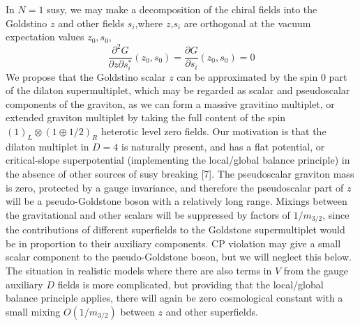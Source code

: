 \documentclass[a4paper,12pt]{article}
\begin{document}
In $N=1$ susy, we may make a decomposition of the chiral fields
into the Goldstino $z$ and other fields $s_{i}$,where $z$,$s_{i}$
are orthogonal at the vacuum expectation values $z_{0},s_{0}$,
\begin{equation}
\frac{\partial^2 G}{\partial z \partial s^{*}_{i}}(z_{0},s_{0}) =
\frac{\partial G}{\partial s_{i}}(z_{0},s_{0}) = 0 \label{PDZ}
\end{equation}
We propose that the Goldstino scalar $z$ can be approximated by
the spin 0 part of the dilaton supermultiplet, which may be
regarded as scalar and pseudoscalar components of the graviton, as
we can form a massive gravitino multiplet, or extended graviton
multiplet by taking the full content of the spin $(1)_{L} \otimes
(1 \oplus 1/2)_{R}$ heterotic level zero fields. Our motivation is
that the dilaton multiplet in $D=4$ is naturally present, and has
a flat potential, or critical-slope superpotential (implementing
the local/global balance principle) in the absence of other
sources of susy breaking [7]. The pseudoscalar graviton mass is
zero, protected by a gauge invariance, and therefore the
pseudoscalar part of $z$ will be a pseudo-Goldstone boson with a
relatively long range. Mixings between the gravitational and other
scalars will be suppressed by factors of $1/m_{3/2}$, since the
contributions of different superfields to the Goldstone
supermultiplet would be in proportion to their auxiliary
components. CP violation may give a small scalar component to the
pseudo-Goldstone boson, but we will neglect this below.
 The situation in realistic models where there are also terms in $V$ from the gauge
auxiliary $D$ fields is more complicated, but providing that the
local/global balance principle applies, there will again be zero
cosmological constant with a small mixing $O(1/m_{3/2})$ between
$z$ and other superfields.
\end{document}
